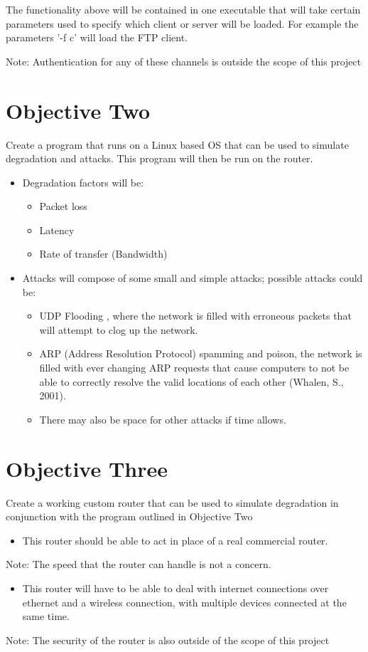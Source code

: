 The functionality above will be contained in one executable that will take certain parameters used to specify which client or server will be loaded. For example the parameters '-f c' will load the FTP client.

Note: Authentication for any of these channels is outside the scope of this project


\section{Objective Two}
\label{sec:obj2}
\label{ref:obj2}
Create a program that runs on a Linux based OS that can be used to simulate degradation and attacks. This program will then be run on the router.

\begin{itemize}
\item Degradation factors will be:
	\begin{itemize}
	\item Packet loss
	\item Latency
	\item Rate of transfer (Bandwidth)
	\end{itemize}
\item Attacks will compose of some small and simple attacks; possible attacks could be:
	\begin{itemize}
	\item UDP Flooding \citep{xiaoming2010denial}, where the network is filled with erroneous packets that will attempt to clog up the network.
	\item ARP (Address Resolution Protocol) spamming and poison, the network is filled with ever changing ARP requests that cause computers to not be able to correctly resolve the 	valid locations of each other (Whalen, S., 2001).
	\item There may also be space for other attacks if time allows.
	\end{itemize}
\end{itemize}

\section{Objective Three}
\label{ref:obj3}
Create a working custom router that can be used to simulate degradation in conjunction with the program outlined in Objective Two

\begin{itemize}
\item This router should be able to act in place of a real commercial router. 
\end{itemize}
Note: The speed that the router can handle is not a concern.
\begin{itemize}
\item This router will have to be able to deal with internet connections over ethernet and a wireless connection, with multiple devices connected at the same time.
\end{itemize}
Note: The security of the router is also outside of the scope of this project

